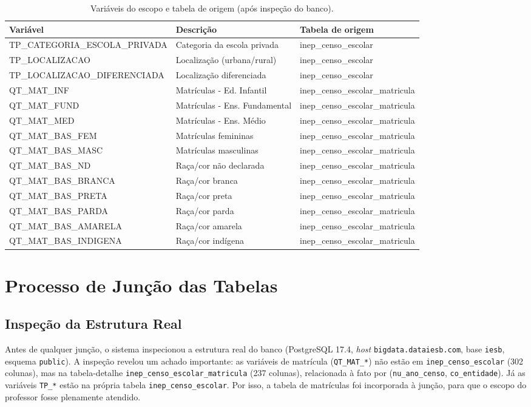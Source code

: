 \documentclass[
    12pt,
    oneside,
    a4paper,
    chapter=TITLE,
    section=TITLE
]{abntex2}
\begin{document}
\begin{table}[H]
\centering
\caption{Variáveis do escopo e tabela de origem (após inspeção do banco).}
\label{tab:variaveis}
\begin{tabular}{lll}
\toprule
\textbf{Variável} & \textbf{Descrição} & \textbf{Tabela de origem} \\
\midrule
TP\_CATEGORIA\_ESCOLA\_PRIVADA & Categoria da escola privada & inep\_censo\_escolar \\
TP\_LOCALIZACAO & Localização (urbana/rural) & inep\_censo\_escolar \\
TP\_LOCALIZACAO\_DIFERENCIADA & Localização diferenciada & inep\_censo\_escolar \\
QT\_MAT\_INF & Matrículas - Ed. Infantil & inep\_censo\_escolar\_matricula \\
QT\_MAT\_FUND & Matrículas - Ens. Fundamental & inep\_censo\_escolar\_matricula \\
QT\_MAT\_MED & Matrículas - Ens. Médio & inep\_censo\_escolar\_matricula \\
QT\_MAT\_BAS\_FEM & Matrículas femininas & inep\_censo\_escolar\_matricula \\
QT\_MAT\_BAS\_MASC & Matrículas masculinas & inep\_censo\_escolar\_matricula \\
QT\_MAT\_BAS\_ND & Raça/cor não declarada & inep\_censo\_escolar\_matricula \\
QT\_MAT\_BAS\_BRANCA & Raça/cor branca & inep\_censo\_escolar\_matricula \\
QT\_MAT\_BAS\_PRETA & Raça/cor preta & inep\_censo\_escolar\_matricula \\
QT\_MAT\_BAS\_PARDA & Raça/cor parda & inep\_censo\_escolar\_matricula \\
QT\_MAT\_BAS\_AMARELA & Raça/cor amarela & inep\_censo\_escolar\_matricula \\
QT\_MAT\_BAS\_INDIGENA & Raça/cor indígena & inep\_censo\_escolar\_matricula \\
\bottomrule
\end{tabular}
\end{table}

\section{Processo de Junção das Tabelas}
\label{sec:juncao}

\subsection{Inspeção da Estrutura Real}
Antes de qualquer junção, o sistema inspecionou a estrutura real do banco (PostgreSQL 17.4,
\textit{host} \texttt{bigdata.dataiesb.com}, base \texttt{iesb}, esquema \texttt{public}). A
inspeção revelou um achado importante: as variáveis de matrícula (\texttt{QT\_MAT\_*}) não estão em
\texttt{inep\_censo\_escolar} (302 colunas), mas na tabela-detalhe
\texttt{inep\_censo\_escolar\_matricula} (237 colunas), relacionada à fato por
(\texttt{nu\_ano\_censo}, \texttt{co\_entidade}). Já as variáveis \texttt{TP\_*} estão na própria
tabela \texttt{inep\_censo\_escolar}. Por isso, a tabela de matrículas foi incorporada à junção,
para que o escopo do professor fosse plenamente atendido.
\end{document}
